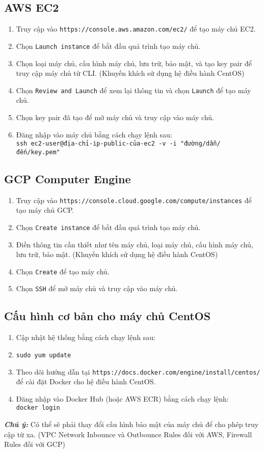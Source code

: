 \subsection{AWS EC2}
\begin{enumerate}
\item Truy cập vào \texttt{https://console.aws.amazon.com/ec2/} để tạo máy chủ EC2.
\item Chọn \texttt{Launch instance} để bắt đầu quá trình tạo máy chủ.
\item Chọn loại máy chủ, cấu hình máy chủ, lưu trữ, bảo mật, và tạo key pair để truy cập máy chủ từ CLI. (Khuyến khích sử dụng hệ điều hành CentOS)
\item Chọn \texttt{Review and Launch} để xem lại thông tin và chọn \texttt{Launch} để tạo máy chủ.
\item Chọn key pair đã tạo để mở máy chủ và truy cập vào máy chủ.
\item {Đăng nhập vào máy chủ bằng cách chạy lệnh sau: \\
\texttt{ssh ec2-user@địa-chỉ-ip-public-của-ec2 -v -i "đường/dẫn/đến/key.pem"}
}
\end{enumerate}
\subsection{GCP Computer Engine}
\begin{enumerate}
\item Truy cập vào \texttt{https://console.cloud.google.com/compute/instances} để tạo máy chủ GCP.
\item Chọn \texttt{Create instance} để bắt đầu quá trình tạo máy chủ.
\item Điền thông tin cần thiết như tên máy chủ, loại máy chủ, cấu hình máy chủ, lưu trữ, bảo mật. (Khuyến khích sử dụng hệ điều hành CentOS)
\item Chọn \texttt{Create} để tạo máy chủ.
\item Chọn \texttt{SSH} để mở máy chủ và truy cập vào máy chủ.
\end{enumerate}

\subsection{Cấu hình cơ bản cho máy chủ CentOS}
\begin{enumerate}
\item Cập nhật hệ thống bằng cách chạy lệnh sau:
\item \texttt{sudo yum update}
\item Theo dõi hướng dẫn tại \texttt{https://docs.docker.com/engine/install/centos/} để cài đặt Docker cho hệ điều hành CentOS.
\item {Đăng nhập vào Docker Hub (hoặc AWS ECR) bằng cách chạy lệnh: \\
    \texttt{docker login}}
\end{enumerate}
\textbf{\textit{Chú ý:}} Có thể sẽ phải thay đổi cấu hình bảo mật của máy chủ để cho phép truy cập từ xa. (VPC Network Inbounce và Outbounce Rules đối với AWS, Firewall Rules đối với GCP)

